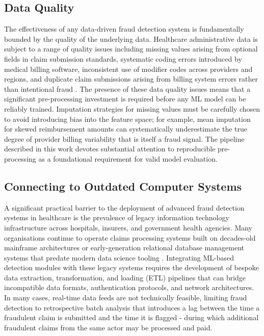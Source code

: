 \subsection{Data Quality}

The effectiveness of any data-driven fraud detection system is fundamentally bounded by the quality of the underlying data. Healthcare administrative data is subject to a range of quality issues including missing values arising from optional fields in claim submission standards, systematic coding errors introduced by medical billing software, inconsistent use of modifier codes across providers and regions, and duplicate claim submissions arising from billing system errors rather than intentional fraud \cite{singh2021}. The presence of these data quality issues means that a significant pre-processing investment is required before any ML model can be reliably trained. Imputation strategies for missing values must be carefully chosen to avoid introducing bias into the feature space; for example, mean imputation for skewed reimbursement amounts can systematically underestimate the true degree of provider billing variability that is itself a fraud signal. The pipeline described in this work devotes substantial attention to reproducible pre-processing as a foundational requirement for valid model evaluation.

\subsection{Connecting to Outdated Computer Systems}

A significant practical barrier to the deployment of advanced fraud detection systems in healthcare is the prevalence of legacy information technology infrastructure across hospitals, insurers, and government health agencies. Many organisations continue to operate claims processing systems built on decades-old mainframe architectures or early-generation relational database management systems that predate modern data science tooling \cite{buczak2016}. Integrating ML-based detection modules with these legacy systems requires the development of bespoke data extraction, transformation, and loading (ETL) pipelines that can bridge incompatible data formats, authentication protocols, and network architectures. In many cases, real-time data feeds are not technically feasible, limiting fraud detection to retrospective batch analysis that introduces a lag between the time a fraudulent claim is submitted and the time it is flagged - during which additional fraudulent claims from the same actor may be processed and paid.

